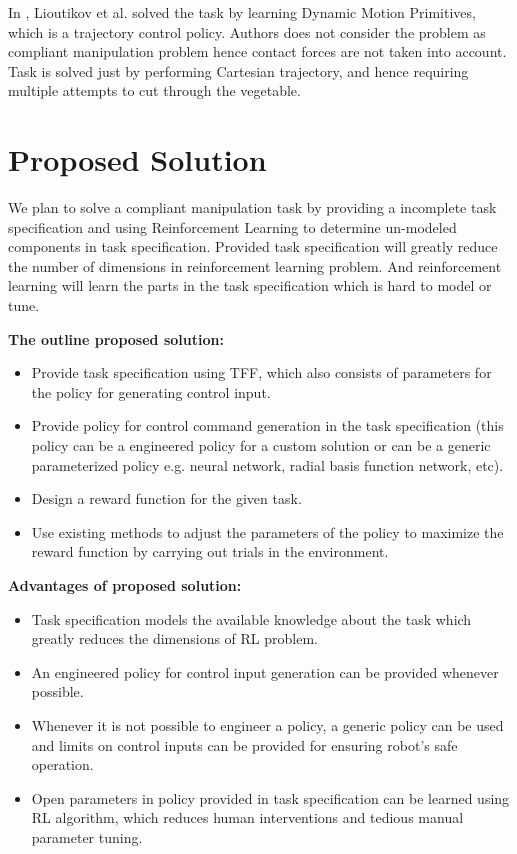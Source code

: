 \documentclass[thesis]{mas_proposal}
\begin{document}
In \cite{lioutikov2016learning}, Lioutikov et al. solved the task by learning Dynamic Motion Primitives, which is a trajectory control policy. Authors does not consider the problem as compliant manipulation problem hence contact forces are not taken into account. Task is solved just by performing Cartesian trajectory, and hence requiring multiple attempts to cut through the vegetable. 


\chapter{Proposed Solution}

We plan to solve a compliant manipulation task by providing a incomplete task specification and using Reinforcement Learning to determine un-modeled components in task specification. Provided task specification will greatly reduce the number of dimensions in reinforcement learning problem. And reinforcement learning will learn the parts in the task specification which is hard to model or tune.



\textbf{The outline proposed solution:}
\begin{itemize}
	\item Provide task specification using TFF, which also consists of parameters for the policy for generating control input.
	\item Provide policy for control command generation in the task specification (this policy can be a engineered policy for a custom solution or can be a generic parameterized policy e.g. neural network, radial basis function network, etc).
	\item Design a reward function for the given task.
	\item Use existing methods to adjust the parameters of the policy to maximize the reward function by carrying out trials in the environment.
\end{itemize}

\textbf{Advantages of proposed solution:}
\begin{itemize}
	\item Task specification models the available knowledge about the task which greatly reduces the dimensions of RL problem.
	\item An engineered policy for control input generation can be provided whenever possible. 
	\item Whenever it is not possible to engineer a policy, a generic policy can be used and limits on control inputs can be provided for ensuring robot's safe operation.
	\item Open parameters in policy provided in task specification can be learned using RL algorithm, which reduces human interventions and tedious manual parameter tuning. 

\end{itemize}
\end{document}
